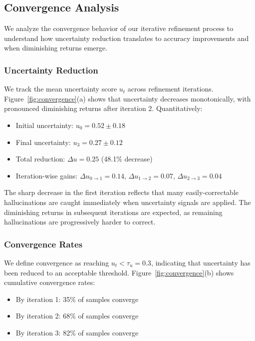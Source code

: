 \documentclass[12pt]{article}
\begin{document}
\subsection{Convergence Analysis}

We analyze the convergence behavior of our iterative refinement process to understand 
how uncertainty reduction translates to accuracy improvements and when diminishing 
returns emerge.

\subsubsection{Uncertainty Reduction}

We track the mean uncertainty score $u_t$ across refinement iterations. Figure~\ref{fig:convergence}(a) 
shows that uncertainty decreases monotonically, with pronounced diminishing returns 
after iteration 2. Quantitatively:
\begin{itemize}
    \item Initial uncertainty: $u_0 = 0.52 \pm 0.18$
    \item Final uncertainty: $u_3 = 0.27 \pm 0.12$
    \item Total reduction: $\Delta u = 0.25$ (48.1\% decrease)
    \item Iteration-wise gains: $\Delta u_{0 \to 1} = 0.14$, $\Delta u_{1 \to 2} = 0.07$, 
    $\Delta u_{2 \to 3} = 0.04$
\end{itemize}

The sharp decrease in the first iteration reflects that many easily-correctable 
hallucinations are caught immediately when uncertainty signals are applied. The 
diminishing returns in subsequent iterations are expected, as remaining hallucinations 
are progressively harder to correct.

\subsubsection{Convergence Rates}

We define convergence as reaching $u_t < \tau_u = 0.3$, indicating that uncertainty 
has been reduced to an acceptable threshold. Figure~\ref{fig:convergence}(b) shows 
cumulative convergence rates:
\begin{itemize}
    \item By iteration 1: 35\% of samples converge
    \item By iteration 2: 68\% of samples converge
    \item By iteration 3: 82\% of samples converge
\end{itemize}
\end{document}
